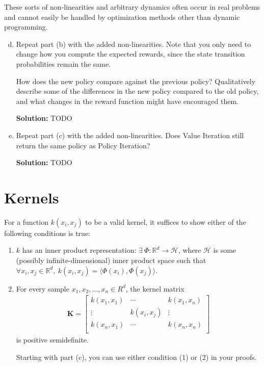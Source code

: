 \documentclass{article}
\newcommand{\Question}[1]{\Large \section{ #1 } \normalsize}
\newcommand{\mat}[1]{\mathbf{#1}}
\newenvironment{solution}{\color{blue} \smallskip \textbf{Solution:}}{}
\begin{document}
These sorts of non-linearities and arbitrary dynamics often occur in real problems and cannot easily be handled by optimization methods other than dynamic programming.
\begin{enumerate}[(a)]
\setcounter{enumi}{3}
\item Repeat part (b) with the added non-linearities. Note that you only need to change how you compute the expected rewards, since the state transition probabilities remain the same.

How does the new policy compare against the previous policy? Qualitatively describe some of the differences in the new policy compared to the old policy, and what changes in the reward function might have encouraged them.

\begin{solution}
TODO
\end{solution}

\clearpage
\item 
Repeat part (c) with the added non-linearities. Does Value Iteration still return the same policy as Policy Iteration?

\begin{solution}
TODO
\end{solution}
\end{enumerate}

\clearpage
\Question{Kernels}

For a function $k(x_i, x_j)$ to be a valid kernel, it suffices to show either of the following conditions is true:
\begin{enumerate}
\item $k$ has an inner product representation: $\exists \ \Phi: \mathbb{R}^d\to \mathcal{H}$, where $\mathcal{H}$ is some (possibly infinite-dimensional) inner product space such that $ \forall x_i, x_j \in \mathbb{R}^d, \ k(x_i, x_j) = \langle\Phi(x_i), \Phi(x_j) \rangle$.
\item For every sample $x_1, x_2, \ldots, x_n \in R^d$, the kernel matrix 
\begin{align*}
\mat{K} =
\begin{bmatrix}
k(x_1, x_1) & \cdots & k(x_1, x_n) \\
\vdots & k(x_i, x_j) & \vdots \\
k(x_n, x_1) & \cdots & k(x_n, x_n) \\
\end{bmatrix}
\end{align*}
is positive semidefinite.

Starting with part (c), you can use either condition (1) or (2) in your proofs.
\end{enumerate}
\end{document}
